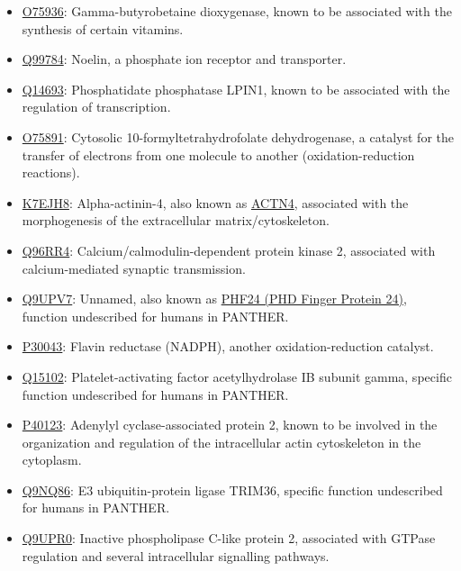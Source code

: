 {\begin{itemize}
\item \href{http://www.pantherdb.org/genes/gene.do?acc=HUMAN\%7CHGNC\%3D964\%7CUniProtKB\%3DO75936}{O75936}: Gamma-butyrobetaine dioxygenase, known to be associated with the synthesis of certain vitamins.
\item \href{http://www.pantherdb.org/genes/gene.do?acc=HUMAN\%7CHGNC\%3D17187\%7CUniProtKB\%3DQ99784}{Q99784}: Noelin, a phosphate ion receptor and transporter.
\item \href{http://www.pantherdb.org/genes/gene.do?acc=HUMAN\%7CHGNC\%3D13345\%7CUniProtKB\%3DQ14693}{Q14693}: Phosphatidate phosphatase LPIN1, known to be associated with the regulation of transcription.
\item \href{http://www.pantherdb.org/genes/gene.do?acc=HUMAN\%7CHGNC\%3D3978\%7CUniProtKB\%3DO75891}{O75891}: Cytosolic 10-formyltetrahydrofolate dehydrogenase, a catalyst for the transfer of electrons from one molecule to another (oxidation-reduction reactions).
\item \href{http://www.pantherdb.org/genes/gene.do?acc=HUMAN\%7CHGNC\%3D166\%7CUniProtKB\%3DO43707}{K7EJH8}: Alpha-actinin-4, also known as \href{https://www.uniprot.org/uniprot/K7EJH8}{ACTN4}, associated with the morphogenesis of the extracellular matrix/cytoskeleton.
\item \href{http://www.pantherdb.org/genes/gene.do?acc=HUMAN\%7CHGNC\%3D1470\%7CUniProtKB\%3DQ96RR4}{Q96RR4}: Calcium/calmodulin-dependent protein kinase 2, associated with calcium-mediated synaptic transmission.
\item \href{http://www.pantherdb.org/genes/gene.do?acc=HUMAN\%7CHGNC\%3D29180\%7CUniProtKB\%3DQ9UPV7}{Q9UPV7}: Unnamed, also known as \href{https://www.uniprot.org/uniprot/Q9UPV7}{PHF24 (PHD Finger Protein 24)}, function undescribed for humans in PANTHER.
\item \href{http://www.pantherdb.org/genes/gene.do?acc=HUMAN\%7CHGNC\%3D1063\%7CUniProtKB\%3DP30043}{P30043}: Flavin reductase (NADPH), another oxidation-reduction catalyst.
\item \href{http://www.pantherdb.org/genes/gene.do?acc=HUMAN\%7CHGNC\%3D8576\%7CUniProtKB\%3DQ15102}{Q15102}: Platelet-activating factor acetylhydrolase IB subunit gamma, specific function undescribed for humans in PANTHER.
\item \href{http://www.pantherdb.org/genes/gene.do?acc=HUMAN\%7CHGNC\%3D20039\%7CUniProtKB\%3DP40123}{P40123}: Adenylyl cyclase-associated protein 2, known to be involved in the organization and regulation of the intracellular actin cytoskeleton in the cytoplasm.
\item \href{http://www.pantherdb.org/genes/gene.do?acc=HUMAN\%7CHGNC\%3D16280\%7CUniProtKB\%3DQ9NQ86}{Q9NQ86}: E3 ubiquitin-protein ligase TRIM36, specific function undescribed for humans in PANTHER.
\item \href{http://www.pantherdb.org/genes/gene.do?acc=HUMAN\%7CHGNC\%3D9064\%7CUniProtKB\%3DQ9UPR0}{Q9UPR0}:  Inactive phospholipase C-like protein 2, associated with GTPase regulation and several intracellular signalling pathways.
\end{itemize}

}

